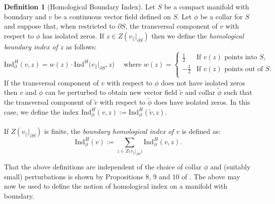 \documentclass[11pt]{article}
\newcommand{\1}{\mathbf{1}}
\theoremstyle{definition}
\newtheorem{defn}{Definition}%
\theoremstyle{remark}
\begin{document}
\begin{mdframed}
    \begin{defn}[Homological Boundary Index] Let $S$ be a compact manifold with boundary and $v$ be a continuous vector field defined on $S$. Let $\phi$ be a collar for $S$ and suppose that, when restricted to $\partial S$, the transversal component of $v$ with respect to $\phi$ has isolated zeros. If $z \in Z(v_{||}|_{\partial S})$ then we define the \textit{homological boundary index of $z$} as follows:
        \begin{equation}\nonumber
            \text{Ind}_\partial^H(v,z)= w(z)\cdot\text{Ind}^H\bigg(v_{||}\big|_{\partial S}, z\bigg) \quad \text{ where }w(z)=\begin{cases}
                \frac{1}{2} & \text{If }v(z)\text{ points into }S\text{,} \\
                -\frac{1}{2} & \text{If }v(z)\text{ points out of }S\text{.} \\
            \end{cases}
        \end{equation}
        If the transversal component of $v$ with respect to $\phi$ does not have isolated zeros then  $v$ and $\phi$ can be perturbed to obtain new vector field $\tilde{v}$ and collar $\tilde{\phi}$ such that the transversal component of $\tilde{v}$ with respect to $\tilde{\phi}$ does have isolated zeros. In this case, we define the index $\text{Ind}_\partial^H(v,z):=\text{Ind}_\partial^H(\tilde{v},z)$. \\
        \\
        If $Z(v_{||}|_{\partial S})$ is finite, the \textit{boundary homological index of $v$} is defined as:
        \begin{equation}\nonumber
            \text{Ind}^H_\partial(v):= \sum_{z \in Z\big(v_{||}\big|_{\partial S}\big)} \text{Ind}^H_\partial(v,z).
        \end{equation}
    \end{defn}
    \vspace{0.1cm}
\end{mdframed}
That the above definitions are independent of the choice of collar $\phi$ and (suitably small) perturbations is shown by Propositions 8, 9 and 10 of \cite{jubin2009generalized}. The above may now be used to define the notion of homological index on a manifold with boundary.
\end{document}
